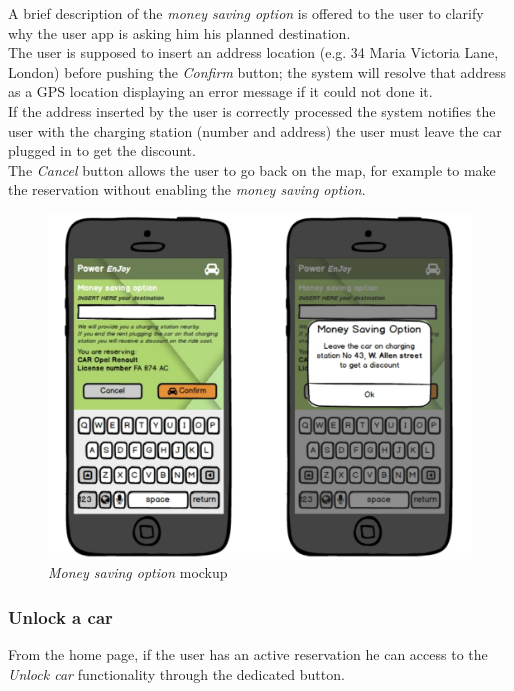 A brief description of the \emph{money saving option} is offered to the user to clarify why the user app is asking him his planned destination. \\

The user is supposed to insert an address location (e.g. 34 Maria Victoria Lane, London) before pushing the \emph{Confirm} button; the system will resolve that address as a GPS location displaying an error message if it could not done it. \\

If the address inserted by the user is correctly processed the system notifies the user with the charging station (number and address) 
the user must leave the car plugged in to get the discount. \\

The \emph{Cancel} button allows the user to go back on the map, for example to make the reservation without enabling the \emph{money saving option}.\\

\begin{figure}[h]
			\centering
			\includegraphics[width=0.9\linewidth]{mockups/moneySavingOption}
			\caption{
				\label{fig:msOption} 
				\emph{Money saving option} mockup
			}
		\end{figure}

\subsubsection{Unlock a car}

From the home page, if the user has an active reservation he can access to the \emph{Unlock car} functionality through the dedicated button. \\

